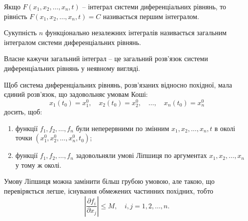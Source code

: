 \begin{definition}
	Якщо $F(x_1, x_2, \ldots, x_n, t)$ -- інтеграл системи диференціальних рівнянь, то рівність $F(x_1, x_2, \ldots, x_n, t) = C$ називається першим інтегралом.
\end{definition}

\begin{definition}
	Сукупність $n$ функціонально незалежних інтегралів називається загальним інтегралом системи диференціальних рівнянь.
\end{definition}

Власне кажучи загальний інтеграл -- це загальний роз\-в'яз\-ок системи диференціальних рівнянь у неявному вигляді.

\begin{theorem}
	Щоб система диференціальних рівнянь, розв'язаних відносно похідної, мала єдиний роз\-в'яз\-ок, що задовольняє умовам Коші: 
	\begin{equation*}
		x_1(t_0) = x_1^0, \quad x_2(t_0) = x_2^0, \quad \ldots, \quad x_n(t_0) = x_n^0
	\end{equation*}
	досить, щоб:
	\begin{enumerate}
		\item функції $f_1, f_2, \ldots, f_n$ були неперервними по змінним $x_1, x_2, \ldots, x_n, t$ в околі точки $\left(x_1^0, x_2^0, \ldots, x_n^0, t_0\right)$;
		\item функції $f_1, f_2, \ldots, f_n$ задовольняли умові Ліпшиця по аргументах $x_1, x_2, \ldots, x_n$ у тому ж околі.
	\end{enumerate}
\end{theorem}

\begin{remark}
	Умову Ліпшиця можна замінити більш грубою умовою, але такою, що перевіряється легше, існування обмежених частинних похідних, тобто 
	\begin{equation*}
		\left| \frac{\partial f_i}{\partial x_j} \right| \le M, \quad i,j = 1, 2, \ldots, n.
	\end{equation*}
\end{remark}